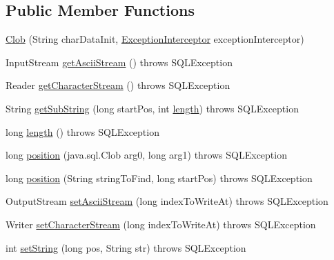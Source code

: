 \subsection*{Public Member Functions}
\begin{DoxyCompactItemize}
\item 
\mbox{\hyperlink{classcom_1_1mysql_1_1cj_1_1jdbc_1_1_clob_a782b5a3df742e495e2b59d7b9b5abdc4}{Clob}} (String char\+Data\+Init, \mbox{\hyperlink{interfacecom_1_1mysql_1_1cj_1_1exceptions_1_1_exception_interceptor}{Exception\+Interceptor}} exception\+Interceptor)
\item 
Input\+Stream \mbox{\hyperlink{classcom_1_1mysql_1_1cj_1_1jdbc_1_1_clob_a207902fd33eb4765d5b102a6512a14fe}{get\+Ascii\+Stream}} ()  throws S\+Q\+L\+Exception 
\item 
Reader \mbox{\hyperlink{classcom_1_1mysql_1_1cj_1_1jdbc_1_1_clob_a2257c466b89e944490f677dfdfc3dbe4}{get\+Character\+Stream}} ()  throws S\+Q\+L\+Exception 
\item 
String \mbox{\hyperlink{classcom_1_1mysql_1_1cj_1_1jdbc_1_1_clob_a6329527c580f97eb9ad48187443b2134}{get\+Sub\+String}} (long start\+Pos, int \mbox{\hyperlink{classcom_1_1mysql_1_1cj_1_1jdbc_1_1_clob_a34d1c1c51a7cab4cb589c6743f78f3d1}{length}})  throws S\+Q\+L\+Exception 
\item 
long \mbox{\hyperlink{classcom_1_1mysql_1_1cj_1_1jdbc_1_1_clob_a34d1c1c51a7cab4cb589c6743f78f3d1}{length}} ()  throws S\+Q\+L\+Exception 
\item 
long \mbox{\hyperlink{classcom_1_1mysql_1_1cj_1_1jdbc_1_1_clob_a94dca4c47b990167d6ab98c87ae43ce4}{position}} (java.\+sql.\+Clob arg0, long arg1)  throws S\+Q\+L\+Exception 
\item 
long \mbox{\hyperlink{classcom_1_1mysql_1_1cj_1_1jdbc_1_1_clob_a294c4cca4be72b8d7f87b97f95d59e54}{position}} (String string\+To\+Find, long start\+Pos)  throws S\+Q\+L\+Exception 
\item 
Output\+Stream \mbox{\hyperlink{classcom_1_1mysql_1_1cj_1_1jdbc_1_1_clob_a689233129f0a3ee09fdb60020a826b59}{set\+Ascii\+Stream}} (long index\+To\+Write\+At)  throws S\+Q\+L\+Exception 
\item 
Writer \mbox{\hyperlink{classcom_1_1mysql_1_1cj_1_1jdbc_1_1_clob_aa21bc09d5e81110704dd1c2c7fad6f75}{set\+Character\+Stream}} (long index\+To\+Write\+At)  throws S\+Q\+L\+Exception 
\item 
int \mbox{\hyperlink{classcom_1_1mysql_1_1cj_1_1jdbc_1_1_clob_a16363c80864ce2bcbee073698856df78}{set\+String}} (long pos, String str)  throws S\+Q\+L\+Exception 

\end{DoxyCompactItemize}
